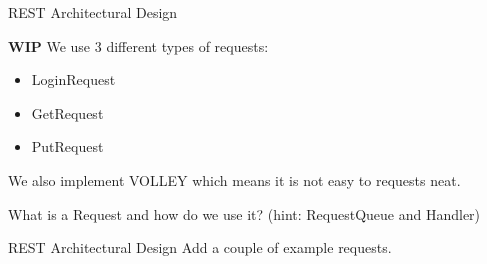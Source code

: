 \begin{frame}{REST Architectural Design}

\textbf{WIP}
We use 3 different types of requests:
\begin{itemize}
\item LoginRequest
\item GetRequest
\item PutRequest
\end{itemize}

We also implement VOLLEY which means it is not easy to requests neat.

What is a Request and how do we use it? (hint: RequestQueue and Handler)
\end{frame}

\begin{frame}{REST Architectural Design}
Add a couple of example requests.
\end{frame}

